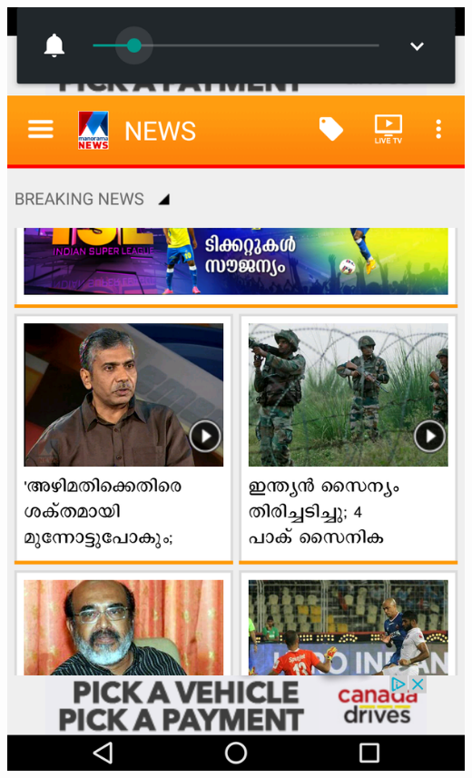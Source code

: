 \documentclass[a4paper, 11pt]{article}
\begin{document}
\includegraphics[scale=0.15]{sb.png}
\end{document}
